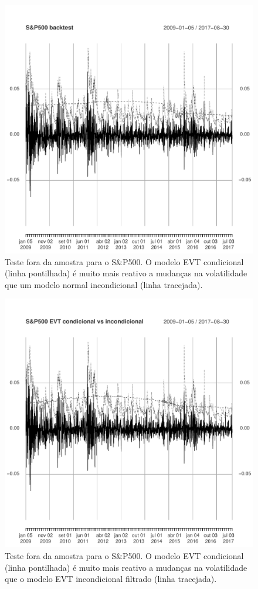 \documentclass[1p]{elsarticle}
\theoremstyle{definition}
\begin{document}
\begin{figure}[H]
	\centering
	\includegraphics[width=1\linewidth]{figs/artigo-sp500backtest}
	\caption{Teste fora da amostra para o S\&P500. O modelo EVT condicional (linha pontilhada) é muito mais reativo a mudanças na volatilidade que um modelo normal incondicional (linha tracejada).}
	\label{fig:artigo-sp500backtest}
\end{figure}

\begin{figure}[H]
	\centering
	\includegraphics[width=1\linewidth]{figs/artigo-sp500evt}
	\caption{Teste fora da amostra para o S\&P500. O modelo EVT condicional (linha pontilhada) é muito mais reativo a mudanças na volatilidade que o modelo EVT incondicional filtrado (linha tracejada).}
	\label{fig:artigo-sp500evt}
\end{figure}
\end{document}
